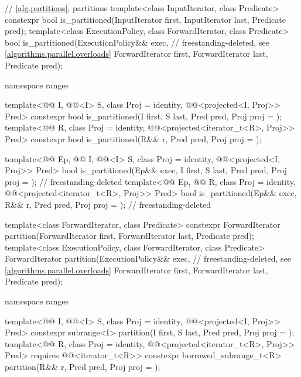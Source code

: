 \begin{codeblock}
{  // \ref{alg.partitions}, partitions
  template<class InputIterator, class Predicate>
    constexpr bool is_partitioned(InputIterator first, InputIterator last, Predicate pred);
  template<class ExecutionPolicy, class ForwardIterator, class Predicate>
    bool is_partitioned(ExecutionPolicy&& exec,                 // freestanding-deleted, see \ref{algorithms.parallel.overloads}
                        ForwardIterator first, ForwardIterator last, Predicate pred);

  namespace ranges {
    template<@@ I, @@<I> S, class Proj = identity,
             @@<projected<I, Proj>> Pred>
      constexpr bool is_partitioned(I first, S last, Pred pred, Proj proj = {});
    template<@@ R, class Proj = identity,
             @@<projected<iterator_t<R>, Proj>> Pred>
      constexpr bool is_partitioned(R&& r, Pred pred, Proj proj = {});

    template<@@ Ep, @@ I, @@<I> S,
             class Proj = identity, @@<projected<I, Proj>> Pred>
      bool is_partitioned(Ep&& exec, I first, S last, Pred pred,
                          Proj proj = {});                                  // freestanding-deleted
    template<@@ Ep, @@ R, class Proj = identity,
             @@<projected<iterator_t<R>, Proj>> Pred>
      bool is_partitioned(Ep&& exec, R&& r, Pred pred, Proj proj = {});     // freestanding-deleted
  }

  template<class ForwardIterator, class Predicate>
    constexpr ForwardIterator partition(ForwardIterator first,
                                        ForwardIterator last,
                                        Predicate pred);
  template<class ExecutionPolicy, class ForwardIterator, class Predicate>
    ForwardIterator partition(ExecutionPolicy&& exec,           // freestanding-deleted, see \ref{algorithms.parallel.overloads}
                              ForwardIterator first,
                              ForwardIterator last,
                              Predicate pred);

  namespace ranges {
    template<@@ I, @@<I> S, class Proj = identity,
             @@<projected<I, Proj>> Pred>
      constexpr subrange<I>
        partition(I first, S last, Pred pred, Proj proj = {});
    template<@@ R, class Proj = identity,
             @@<projected<iterator_t<R>, Proj>> Pred>
      requires @@<iterator_t<R>>
      constexpr borrowed_subrange_t<R>
        partition(R&& r, Pred pred, Proj proj = {});

}}
\end{codeblock}

